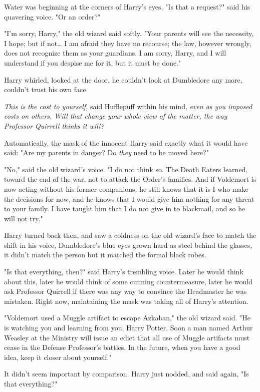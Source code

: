 Water was beginning at the corners of Harry's eyes. "Is that a request?" said
his quavering voice. "Or an order?"

"I'm sorry, Harry," the old wizard said softly. "Your parents will see the
necessity, I hope; but if not{\ldots} I am afraid they have no recourse; the
law, however wrongly, does not recognize them as your guardians. I am sorry,
Harry, and I will understand if you despise me for it, but it must be done."

Harry whirled, looked at the door, he couldn't look at Dumbledore any more,
couldn't trust his own face.

\emph{This is the cost to yourself,} said Hufflepuff within his mind,
\emph{even as you imposed costs on others. Will that change your whole view of
the matter, the way Professor Quirrell thinks it will?}

Automatically, the mask of the innocent Harry said exactly what it would have
said: "Are my parents in danger? Do \emph{they} need to be moved here?"

"No," said the old wizard's voice. "I do not think so. The Death Eaters
learned, toward the end of the war, not to attack the Order's families. And if
Voldemort is now acting without his former companions, he still knows that it
is I who make the decisions for now, and he knows that I would give him nothing
for any threat to your family. I have taught him that I do not give in to
blackmail, and so he will not try."

Harry turned back then, and saw a coldness on the old wizard's face to match
the shift in his voice, Dumbledore's blue eyes grown hard as steel behind the
glasses, it didn't match the person but it matched the formal black robes.

"Is that everything, then?" said Harry's trembling voice. Later he would think
about this, later he would think of some cunning countermeasure, later he would
ask Professor Quirrell if there was any way to convince the Headmaster he was
mistaken. Right now, maintaining the mask was taking all of Harry's attention.

"Voldemort used a Muggle artifact to escape Azkaban," the old wizard said. "He
is watching you and learning from you, Harry Potter. Soon a man named Arthur
Weasley at the Ministry will issue an edict that all use of Muggle artifacts
must cease in the Defense Professor's battles. In the future, when you have a
good idea, keep it closer about yourself."

It didn't seem important by comparison. Harry just nodded, and said again, "Is
that everything?"

